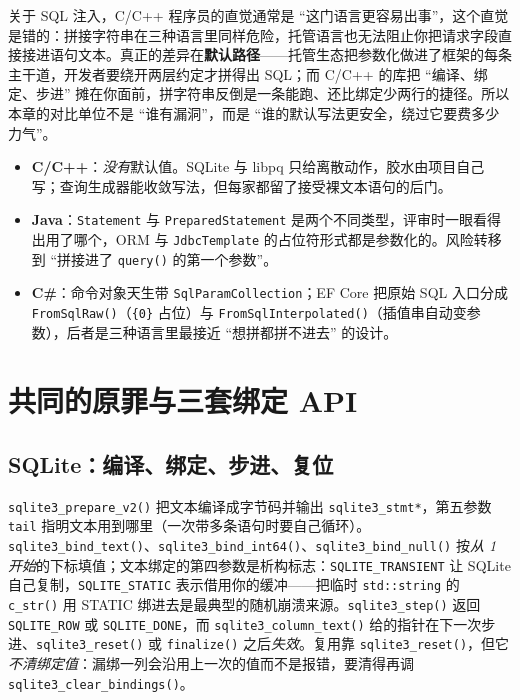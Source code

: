 \documentclass[12pt,a4paper,fontset=fandol]{ctexbook}
\newcommand{\Fn}[1]{\texttt{#1()}}
\newcommand{\Tp}[1]{\texttt{#1}}
\newcommand{\CSharp}{C\#}
\newcommand{\CppJava}{C/C++}
\begin{document}
关于 SQL 注入，\CppJava{} 程序员的直觉通常是 ``这门语言更容易出事''，这个直觉是错的：拼接字符串在三种语言里同样危险，托管语言也无法阻止你把请求字段直接接进语句文本。真正的差异在\textbf{默认路径}——托管生态把参数化做进了框架的每条主干道，开发者要绕开两层约定才拼得出 SQL；而 \CppJava{} 的库把 ``编译、绑定、步进'' 摊在你面前，拼字符串反倒是一条能跑、还比绑定少两行的捷径。所以本章的对比单位不是 ``谁有漏洞''，而是 ``谁的默认写法更安全，绕过它要费多少力气''。

\begin{compare}[title=三种语言交给你的 ``安全默认值'']
\begin{itemize}
  \item \textbf{\CppJava{}}：\emph{没有}默认值。SQLite 与 libpq 只给离散动作，胶水由项目自己写；查询生成器能收敛写法，但每家都留了接受裸文本语句的后门。
  \item \textbf{Java}：\Tp{Statement} 与 \Tp{PreparedStatement} 是两个不同类型，评审时一眼看得出用了哪个，ORM 与 \Tp{JdbcTemplate} 的占位符形式都是参数化的。风险转移到 ``拼接进了 \Fn{query} 的第一个参数''。
  \item \textbf{\CSharp{}}：命令对象天生带 \Tp{Sql\allowbreak Param\allowbreak Collection}；EF Core 把原始 SQL 入口分成 \Fn{FromSqlRaw}（\texttt{\{0\}} 占位）与 \Fn{From\allowbreak SqlInterpolated}（插值串自动变参数），后者是三种语言里最接近 ``想拼都拼不进去'' 的设计。
\end{itemize}
\end{compare}

\section{共同的原罪与三套绑定 API}

\subsection{SQLite：编译、绑定、步进、复位}

\Fn{sqlite3\_\allowbreak{}prepare\_\allowbreak{}v2} 把文本编译成字节码并输出 \Tp{sqlite3\_\allowbreak{}stmt*}，第五参数 \Tp{tail} 指明文本用到哪里（一次带多条语句时要自己循环）。\Fn{sqlite3\_\allowbreak{}bind\_\allowbreak{}text}、\Fn{sqlite3\_\allowbreak{}bind\_\allowbreak{}int64}、\Fn{sqlite3\_\allowbreak{}bind\_\allowbreak{}null} 按\emph{从 1 开始}的下标填值；文本绑定的第四参数是析构标志：\Tp{SQLITE\_\allowbreak{}TRANSIENT} 让 SQLite 自己复制，\Tp{SQLITE\_\allowbreak{}STATIC} 表示借用你的缓冲——把临时 \Tp{std::string} 的 \Fn{c\_str} 用 STATIC 绑进去是最典型的随机崩溃来源。\Fn{sqlite3\_\allowbreak{}step} 返回 \Tp{SQLITE\_ROW} 或 \Tp{SQLITE\_\allowbreak{}DONE}，而 \Fn{sqlite3\_\allowbreak{}column\_\allowbreak{}text} 给的指针在下一次步进、\Fn{sqlite3\_\allowbreak{}reset} 或 \Fn{finalize} 之后\emph{失效}。复用靠 \Fn{sqlite3\_\allowbreak{}reset}，但它\emph{不清绑定值}：漏绑一列会沿用上一次的值而不是报错，要清得再调 \Fn{sqlite3\_\allowbreak{}clear\_\allowbreak{}bindings}。
\end{document}
